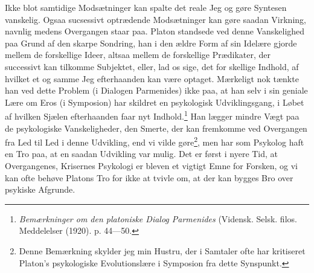 \documentclass[12pt]{article}
\newcommand{\opage}[1]{\marginnote{\footnotesize\textit{[#1]}}}
\begin{document}
Ikke blot samtidige Modsætninger kan spalte det reale Jeg og gøre
Syntesen vanskelig. Ogsaa sucsessivt optrædende Modsætninger kan gøre
saadan Virkning, navnlig medens Overgangen staar paa. Platon standsede
ved denne Vanskelighed paa Grund af den skarpe Sondring, han i den
ældre Form af sin Idelære gjorde mellem de forskellige Ideer, altsaa
mellem de forskellige Prædikater, der successivt kan tilkomme
Subjektet, eller, lad os sige, det for%
\setcounter{footnote}{0}%
\opage{39}skellige Indhold, af hvilket et og samme Jeg efterhaanden kan være
optaget. Mærkeligt nok tænkte han ved dette Problem (i Dialogen
Parmenides) ikke paa, at han selv i sin geniale Lære om Eros (i
Symposion) har skildret en psykologisk Udviklingsgang, i Løbet af
hvilken Sjælen efterhaanden faar nyt Indhold.\footnote{\textit{Bemærkninger
om den platoniske Dialog Parmenides}
(Vidensk. Selsk. filos. Meddelelser (1920). p. 44---50.} Han lægger
mindre Vægt paa de psykologiske Vanskeligheder, den Smerte, der kan
fremkomme ved Overgangen fra Led til Led i denne Udvikling, end vi
vilde gøre\footnote{Denne Bemærkning skylder jeg min Hustru, der i
Samtaler ofte har kritiseret Platon's psykologiske Evolutionslære i
\guillemotright{}Symposion\guillemotleft{} fra dette Synspunkt.}, men har
som Psykolog haft en Tro paa, at en saadan Udvikling var mulig. Det er
først i nyere Tid, at Overgangenes, Krisernes Psykologi er bleven et
vigtigt Emne for Forsken, og vi kan ofte behøve Platons Tro for ikke at
tvivle om, at der kan bygges Bro over psykiske Afgrunde.
\end{document}
